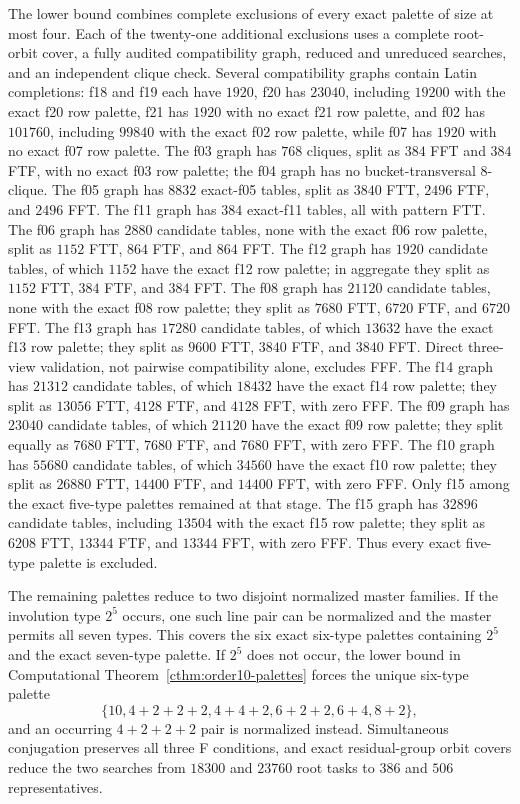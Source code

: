 The lower bound combines complete exclusions of every exact palette of size
at most four.  Each of the twenty-one additional exclusions uses a complete
root-orbit cover, a fully audited compatibility graph, reduced and
unreduced searches, and an independent clique check.  Several compatibility
graphs contain Latin completions: f18 and f19 each have $1920$, f20 has
$23040$, including $19200$ with the exact f20 row palette, f21 has $1920$
with no exact f21 row palette, and f02 has $101760$, including $99840$ with
the exact f02 row palette, while f07 has $1920$ with no exact f07 row palette.
The f03 graph has $768$ cliques, split as $384$ FFT and $384$ FTF, with no
exact f03 row palette; the f04 graph has no bucket-transversal $8$-clique.
The f05 graph has $8832$ exact-f05 tables, split as $3840$ FTT, $2496$ FTF,
and $2496$ FFT.  The f11 graph has $384$ exact-f11 tables, all with pattern
FTT.  The f06 graph has $2880$ candidate tables, none with the exact f06 row
palette, split as $1152$ FTT, $864$ FTF, and $864$ FFT.  The f12 graph has
$1920$ candidate tables, of which $1152$ have the exact f12 row palette; in
aggregate they split as $1152$ FTT, $384$ FTF, and $384$ FFT.
The f08 graph has $21120$ candidate tables, none with the exact f08 row
palette; they split as $7680$ FTT, $6720$ FTF, and $6720$ FFT.  The f13
graph has $17280$ candidate tables, of which $13632$ have the exact f13 row
palette; they split as $9600$ FTT, $3840$ FTF, and $3840$ FFT.  Direct
three-view validation, not pairwise compatibility alone, excludes FFF.  The
f14 graph has $21312$ candidate tables, of which $18432$ have the exact f14
row palette; they split as $13056$ FTT, $4128$ FTF, and $4128$ FFT, with zero
FFF.  The f09 graph has $23040$ candidate tables, of which $21120$ have the
exact f09 row palette; they split equally as $7680$ FTT, $7680$ FTF, and
$7680$ FFT, with zero FFF.  The f10 graph has $55680$ candidate tables, of
which $34560$ have the exact f10 row palette; they split as $26880$ FTT,
$14400$ FTF, and $14400$ FFT, with zero FFF.  Only f15 among the exact
five-type palettes remained at that stage. The f15 graph has $32896$
candidate tables, including $13504$ with the exact f15 row palette; they
split as $6208$ FTT, $13344$ FTF, and $13344$ FFT, with zero FFF. Thus every
exact five-type palette is excluded.

The remaining palettes reduce to two disjoint normalized master families.
If the involution type $2^5$ occurs, one such line pair can be normalized and
the master permits all seven types.  This covers the six exact six-type
palettes containing $2^5$ and the exact seven-type palette.  If $2^5$ does not
occur, the lower bound in Computational
Theorem~\ref{cthm:order10-palettes} forces the unique six-type palette
\[
 \{10,4+2+2+2,4+4+2,6+2+2,6+4,8+2\},
\]
and an occurring $4+2+2+2$ pair is normalized instead.  Simultaneous
conjugation preserves all three F conditions, and exact residual-group orbit
covers reduce the two searches from $18300$ and $23760$ root tasks to $386$
and $506$ representatives.

